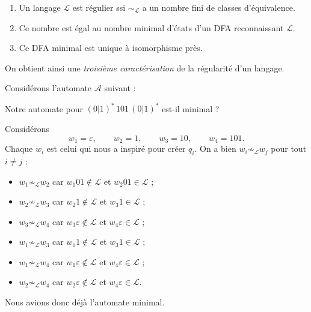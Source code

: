 \begin{theoreme}
\leavevmode
\begin{enumerate}
  \item Un langage $\mathcal{L}$ est régulier ssi $\sim_{\mathcal{L}}$ a un nombre fini de classes d'équivalence.
  \item Ce nombre est égal au nombre minimal d'états d'un DFA reconnaissant $\mathcal{L}$.
  \item Ce DFA minimal est unique à isomorphisme près.
\end{enumerate}
\end{theoreme}

\begin{remarque}
On obtient ainsi une \emph{troisième caractérisation} de la régularité d'un langage.
\end{remarque}

\begin{exemple}
Considérons l'automate $\mathcal{A}$ suivant :
\begin{center}
\end{center}
Notre automate pour $(0|1)^*\,101\,(0|1)^*$ est-il minimal ?

Considérons
\[
w_1 = \varepsilon, \qquad w_2 = 1, \qquad w_3 = 10, \qquad w_4 = 101.
\]
Chaque $w_i$ est celui qui nous a inspiré pour créer $q_i$. On a bien $w_i \not\sim_{\mathcal{L}} w_j$ pour tout $i \neq j$ :
\begin{itemize}
  \item $w_1 \not\sim_{\mathcal{L}} w_2$ car $w_1 01 \notin \mathcal{L}$ et $w_2 01 \in \mathcal{L}$ ;
  \item $w_2 \not\sim_{\mathcal{L}} w_3$ car $w_2 1 \notin \mathcal{L}$ et $w_3 1 \in \mathcal{L}$ ;
  \item $w_3 \not\sim_{\mathcal{L}} w_4$ car $w_3 \varepsilon \notin \mathcal{L}$ et $w_4 \varepsilon \in \mathcal{L}$ ;
  \item $w_1 \not\sim_{\mathcal{L}} w_3$ car $w_1 1 \notin \mathcal{L}$ et $w_3 1 \in \mathcal{L}$ ;
  \item $w_1 \not\sim_{\mathcal{L}} w_4$ car $w_1 \varepsilon \notin \mathcal{L}$ et $w_4 \varepsilon \in \mathcal{L}$ ;
  \item $w_2 \not\sim_{\mathcal{L}} w_4$ car $w_2 \varepsilon \notin \mathcal{L}$ et $w_4 \varepsilon \in \mathcal{L}$.
\end{itemize}
Nous avions donc déjà l'automate minimal.
\end{exemple}

